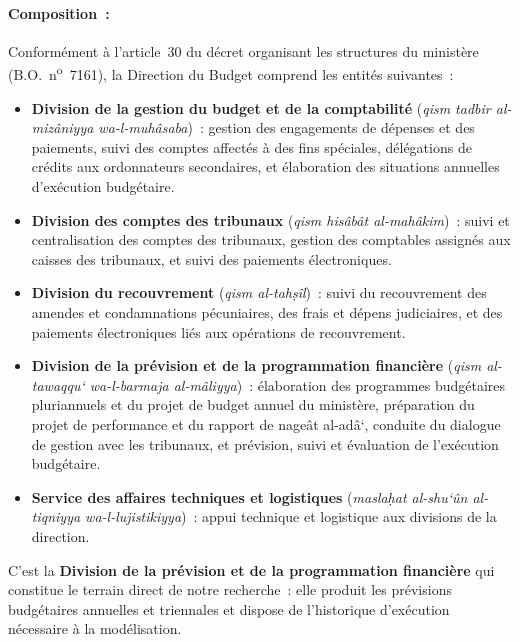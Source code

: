 \paragraph{Composition~:}

Conform\'ement \`a l'article~30 du d\'ecret organisant les structures du minist\`ere (B.O.\ n\textsuperscript{o}~7161), la Direction du Budget comprend les entit\'es suivantes~:

\begin{itemize}
    \item \textbf{Division de la gestion du budget et de la comptabilit\'e} (\textit{qism tadbir al-miz\^aniyya wa-l-muh\^asaba})~: gestion des engagements de d\'epenses et des paiements, suivi des comptes affect\'es \`a des fins sp\'eciales, d\'el\'egations de cr\'edits aux ordonnateurs secondaires, et \'elaboration des situations annuelles d'ex\'ecution budg\'etaire.

    \item \textbf{Division des comptes des tribunaux} (\textit{qism his\^ab\^at al-mah\^akim})~: suivi et centralisation des comptes des tribunaux, gestion des comptables assign\'es aux caisses des tribunaux, et suivi des paiements \'electroniques.

    \item \textbf{Division du recouvrement} (\textit{qism al-tah\d{s}\^il})~: suivi du recouvrement des amendes et condamnations p\'ecuniaires, des frais et d\'epens judiciaires, et des paiements \'electroniques li\'es aux op\'erations de recouvrement.

    \item \textbf{Division de la pr\'evision et de la programmation financi\`ere} (\textit{qism al-tawaqqu\textquoteleft{} wa-l-barmaja al-m\^aliyya})~: \'elaboration des programmes budg\'etaires pluriannuels et du projet de budget annuel du minist\`ere, pr\'eparation du projet de performance et du rapport de nageât al-ad\^a\textquoteleft, conduite du dialogue de gestion avec les tribunaux, et pr\'evision, suivi et \'evaluation de l'ex\'ecution budg\'etaire.

    \item \textbf{Service des affaires techniques et logistiques} (\textit{masla\d{h}at al-shu\textquoteleft\^un al-tiqniyya wa-l-lujistikiyya})~: appui technique et logistique aux divisions de la direction.
\end{itemize}

C'est la \textbf{Division de la pr\'evision et de la programmation financi\`ere} qui constitue le terrain direct de notre recherche~: elle produit les pr\'evisions budg\'etaires annuelles et triennales et dispose de l'historique d'ex\'ecution n\'ecessaire \`a la mod\'elisation.

